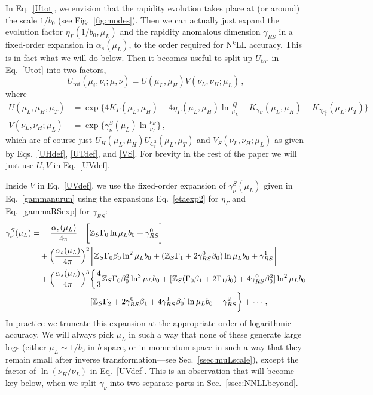 \documentclass[a4,letterpaper,11pt]{article}
\newcommand{\nn}{\nonumber}
\newcommand{\be}{\begin{equation}}
\newcommand{\ee}{\end{equation}}
\newcommand{\as}{\alpha_s}
\newcommand{\zed}{\mathbb{Z}}
\newcommand{\eq}[1]{Eq.~\eqref{#1}}
\newcommand{\eqss}[3]{Eqs.~\eqref{#1}, \eqref{#2}, and \eqref{#3}}
\newcommand{\ssec}[1]{Sec.~\ref{ssec:#1}}
\newcommand{\fig}[1]{Fig.~\ref{fig:#1}}
\begin{document}
In \eq{Utot}, we envision that the rapidity evolution takes place at (or around) the scale $1/b_0$ (see \fig{modes}). Then we can actually just expand the evolution factor $\eta_\Gamma(1/b_0,\mu_L)$ and the rapidity anomalous dimension $\gamma_{RS}$ in a fixed-order expansion in $\as(\mu_L)$, to the order required for N$^k$LL accuracy. This is in fact what we will do below. Then it becomes useful to split up $U_{\text{tot}}$ in \eq{Utot} into two factors, 
\be
\label{UVsplit}
U_{\text{tot}}(\mu_i,\nu_i;\mu,\nu) = U(\mu_L,\mu_H) V(\nu_L,\nu_H;\mu_L)\,,
\ee
where
\begin{align}
\label{UVdef}
U(\mu_L,\mu_H, \mu_T) &= \exp\biggl\{4 K_\Gamma(\mu_L,\mu_H) - 4 \eta_\Gamma(\mu_L,\mu_H) \ln\frac{Q}{\mu_L} - K_{\gamma_H}(\mu_L,\mu_H)- K_{\gamma_{C_t^2}}(\mu_L,\mu_T)\biggr\} \nn \\
V(\nu_L,\nu_H;\mu_L) &= \exp\biggl\{ \gamma_\nu^S (\mu_L) \ln\frac{\nu_H}{\nu_L}\biggr\} \,,
\end{align}
which are of course just $U_H(\mu_L,\mu_H)U_{C_t^2}(\mu_L,\mu_T)$ and $V_S(\nu_L,\nu_H;\mu_L)$ as given by \eqss{UHdef}{UTdef}{VS}. For brevity in the rest of the paper we will just use $U,V$ in \eq{UVdef}. 


Inside $V$ in \eq{UVdef}, we use the fixed-order expansion of $\gamma_\nu^S(\mu_L)$ given in \eq{gammanurun} using the expansions \eq{etaexp2} for $\eta_\Gamma$ and  \eq{gammaRSexp} for $\gamma_{RS}$:
\begin{align}
\label{gammanuexp}
\gamma_\nu^S(\mu_L) &=  \quad \frac{\as(\mu_L)}{4\pi} \quad \biggl[\zed_S \Gamma_0 \ln \mu_L b_0 + \gamma_{RS}^0 \biggr] \\
&\quad +  \Bigl(\frac{\as(\mu_L)}{4\pi}\Bigr)^2 \biggl[ \zed_S \Gamma_0\beta_0 \ln^2 \mu_L b_0 +( \zed_S  \Gamma_1 + 2\gamma_{RS}^0 \beta_0 )\ln \mu_L b_0 + \gamma_{RS}^1\biggr] \nn \\
&\quad + \Bigl(\frac{\as(\mu_L)}{4\pi}\Bigr)^3 \biggl\{ \frac{4}{3}\zed_S \Gamma_0\beta_0^2 \ln^3 \mu_L b_0 + [ \zed_S (\Gamma_0 \beta_1 + 2\Gamma_1\beta_0) + 4\gamma_{RS}^0\beta_0^2]\ln^2 \mu_L b_0 \nn \\
&\qquad\qquad\qquad  + [\zed_S \Gamma_2 + 2\gamma_{RS}^0 \beta_1 + 4\gamma_{RS}^1\beta_0]\ln \mu_L b_0 + \gamma_{RS}^2\biggr\} + \cdots \,, \nn
\end{align}
In practice we truncate this expansion at the appropriate order of logarithmic accuracy. We will always pick $\mu_L$ in such a way that none of these generate large logs (either $\mu_L\sim 1/b_0$ in $b$ space, or in momentum space in such a way that they remain small after inverse transformation---see \ssec{muLscale}), except the factor of $\ln(\nu_H/\nu_L)$ in \eq{UVdef}. This is an observation that will become key below, when we split $\gamma_\nu$ into two separate parts in \ssec{NNLLbeyond}.
\end{document}
